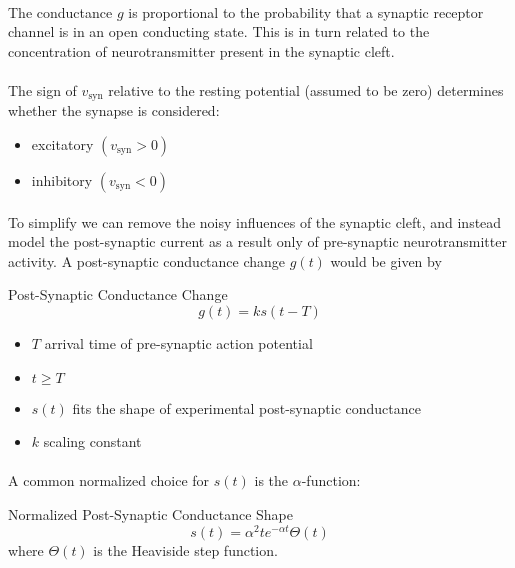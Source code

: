 \documentclass{article}
\begin{document}
\paragraph{}
The conductance $g$ is proportional to the probability that a synaptic receptor channel is in an open conducting state. This is in turn related to the concentration of neurotransmitter present in the synaptic cleft.

\paragraph{}
The sign of $v_{\text{syn}}$ relative to the resting potential (assumed to be zero) determines whether the synapse is considered:
\begin{itemize}
\item excitatory $( v_{\text{syn}} > 0 )$
\item inhibitory $( v_{\text{syn}} < 0 )$
\end{itemize}

\paragraph{}
To simplify we can remove the noisy influences of the synaptic cleft, and instead model the post-synaptic current as a result only of pre-synaptic neurotransmitter activity. A post-synaptic conductance change $g(t)$ would be given by
\begin{function}{Post-Synaptic Conductance Change}\label{fun:g}
\[ g(t) = ks( t- T ) \]
\begin{itemize}
\item $T$ arrival time of pre-synaptic action potential
\item $t \ge T$
\item $s(t)$ fits the shape of experimental post-synaptic conductance
\item $k$ scaling constant
\end{itemize}
\end{function}

\paragraph{}
A common normalized choice for $s(t)$ is the $\alpha$-function:
\begin{function}{Normalized Post-Synaptic Conductance Shape}
\[ s(t) = \alpha ^{2}t e^{-\alpha t} \Theta(t) \]
where $\Theta(t)$ is the Heaviside step function.
\end{function}
\end{document}
